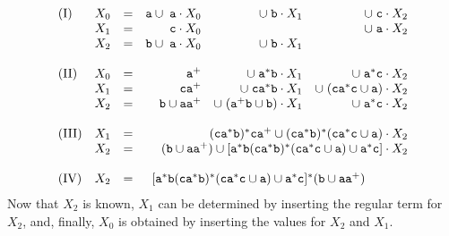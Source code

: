 $$\begin{array}{ll@{\quad = \quad}rrr}
\mbox{(I)} & X_0 & \mbox{\tt a} \cup\; \mbox{\tt a}\cdot X_0
    & \cup\; \mbox{\tt b} \cdot X_1
    & \cup\; \mbox{\tt c} \cdot X_2 \\
    & X_1 &   \mbox{\tt c} \cdot X_0 &
    & \cup \; \mbox{\tt a} \cdot X_2 \\
    & X_2 & \mbox{\tt b} \cup\; \mbox{\tt a} \cdot X_0
    & \cup \; \mbox{\tt b} \cdot X_1
    & \\
    \multicolumn{5}{c}{} \\
\mbox{(II)} & X_0 & \mbox{\tt a}^+ & \cup \; \mbox{\tt a}^{\ast}
    \mbox{\tt b} \cdot X_1
    & \cup \; \mbox{\tt a}^{\ast}\mbox{\tt c} \cdot X_2 \\
     & X_1 & \mbox{\tt ca}^+  & \cup \; \mbox{\tt ca}^{\ast}%
    \mbox{\tt b} \cdot X_1
    & \cup \; (\mbox{\tt ca}^{\ast}\mbox{\tt c} \cup %
    \mbox{\tt a}) \cdot X_2 \\
     & X_2 & \mbox{\tt b} \cup \mbox{\tt aa}^+ & \cup\;
     (\mbox{\tt a}^+ \mbox{\tt b} \cup \mbox{\tt b})
    \cdot X_1 & \cup \; \mbox{\tt a}^{\ast} \mbox{\tt c}
    \cdot X_2 \\
    \multicolumn{5}{c}{} \\
\mbox{(III)} & X_1 & 
    \multicolumn{3}{r}{%
	(\mbox{\tt ca}^{\ast}\mbox{\tt b})^{\ast} \mbox{\tt ca}^+ 
    \cup (\mbox{\tt ca}^{\ast}\mbox{\tt b})^{\ast}%
    (\mbox{\tt ca}^{\ast}\mbox{\tt c} \cup \mbox{\tt a})
    \cdot X_2} \\
       & X_2 &  
    \multicolumn{3}{r}{%
       (\mbox{\tt b} \cup \mbox{\tt aa}^+) 
    \cup [\mbox{\tt a}^{\ast}\mbox{\tt b}
    (\mbox{\tt ca}^{\ast}\mbox{\tt b})^{\ast}
    (\mbox{\tt ca}^{\ast}\mbox{\tt c} \cup \mbox{\tt a}) %
    \cup \mbox{\tt a}^{\ast}\mbox{\tt c}] \cdot X_2} \\
    \multicolumn{5}{c}{} \\
\mbox{(IV)} & X_2 & \multicolumn{3}{l}{%
    [\mbox{\tt a}^{\ast}\mbox{\tt b} 
    (\mbox{\tt ca}^{\ast}\mbox{\tt b})^{\ast}
    (\mbox{\tt ca}^{\ast}\mbox{\tt c} \cup \mbox{\tt a}) %
    \cup \mbox{\tt a}^{\ast}\mbox{\tt c}]^{\ast} %
    (\mbox{\tt b} \cup \mbox{\tt aa}^+)}
    \end{array}$$
Now that $X_2$ is known, $X_1$ can be determined by inserting the 
regular term for $X_2$, and, finally, $X_0$ is obtained by inserting 
the values for $X_2$ and $X_1$.
\nocite{kleene:regular}
